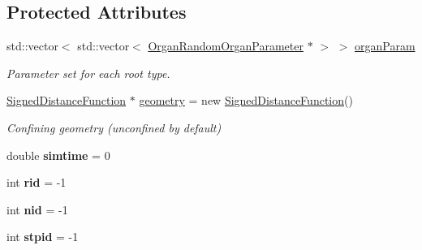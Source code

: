 \subsection*{Protected Attributes}
\begin{DoxyCompactItemize}
\item 
\mbox{\label{classCPlantBox_1_1Plant_a7e4ec9c8927600a9dfa930fbb6a2d5f5}} 
std\+::vector$<$ std\+::vector$<$ \hyperlink{classCPlantBox_1_1OrganRandomOrganParameter}{Organ\+Random\+Organ\+Parameter} $\ast$ $>$ $>$ \hyperlink{classCPlantBox_1_1Plant_a7e4ec9c8927600a9dfa930fbb6a2d5f5}{organ\+Param}
\begin{DoxyCompactList}\small\item\em Parameter set for each root type. \end{DoxyCompactList}\item 
\mbox{\label{classCPlantBox_1_1Plant_a3deecaecf558301cdf492fc1a24bd4c4}} 
\hyperlink{classCPlantBox_1_1SignedDistanceFunction}{Signed\+Distance\+Function} $\ast$ \hyperlink{classCPlantBox_1_1Plant_a3deecaecf558301cdf492fc1a24bd4c4}{geometry} = new \hyperlink{classCPlantBox_1_1SignedDistanceFunction}{Signed\+Distance\+Function}()
\begin{DoxyCompactList}\small\item\em Confining geometry (unconfined by default) \end{DoxyCompactList}\item 
\mbox{\label{classCPlantBox_1_1Plant_a265c171f51c183d5a1289a7ecff70408}} 
double {\bfseries simtime} = 0
\item 
\mbox{\label{classCPlantBox_1_1Plant_ae3ec9c0c1ccfc060f7921ff254041454}} 
int {\bfseries rid} = -\/1
\item 
\mbox{\label{classCPlantBox_1_1Plant_a5d21f2c5bdfe451817328a22aa49f844}} 
int {\bfseries nid} = -\/1
\item 
\mbox{\label{classCPlantBox_1_1Plant_aa20c560b5fcbf7398a8af9182bdcd018}} 
int {\bfseries stpid} = -\/1
\item 
\mbox{\label{classCPlantBox_1_1Plant_aad36a99a846e38086bce7bbb67bf1632}} 

\end{DoxyCompactItemize}
